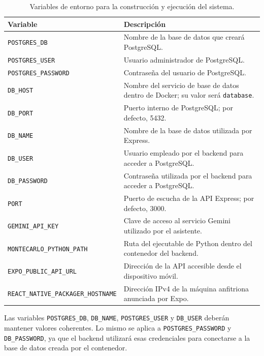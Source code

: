 \begin{table}[H]
\centering
\caption{Variables de entorno para la construcci\'on y ejecuci\'on del sistema.}
\label{tab:variables-entorno-construccion}
\begin{tabular}{|p{4.8cm}|p{8.2cm}|}
\hline
\textbf{Variable} & \textbf{Descripci\'on} \\
\hline
\texttt{POSTGRES\_DB} & Nombre de la base de datos que crear\'a PostgreSQL. \\
\hline
\texttt{POSTGRES\_USER} & Usuario administrador de PostgreSQL. \\
\hline
\texttt{POSTGRES\_PASSWORD} & Contrase\~na del usuario de PostgreSQL. \\
\hline
\texttt{DB\_HOST} & Nombre del servicio de base de datos dentro de Docker; su valor ser\'a \texttt{database}. \\
\hline
\texttt{DB\_PORT} & Puerto interno de PostgreSQL; por defecto, 5432. \\
\hline
\texttt{DB\_NAME} & Nombre de la base de datos utilizada por Express. \\
\hline
\texttt{DB\_USER} & Usuario empleado por el backend para acceder a PostgreSQL. \\
\hline
\texttt{DB\_PASSWORD} & Contrase\~na utilizada por el backend para acceder a PostgreSQL. \\
\hline
\texttt{PORT} & Puerto de escucha de la API Express; por defecto, 3000. \\
\hline
\texttt{GEMINI\_API\_KEY} & Clave de acceso al servicio Gemini utilizado por el asistente. \\
\hline
\texttt{MONTECARLO\_PYTHON\_PATH} & Ruta del ejecutable de Python dentro del contenedor del backend. \\
\hline
\texttt{EXPO\_PUBLIC\_API\_URL} & Direcci\'on de la API accesible desde el dispositivo m\'ovil. \\
\hline
\texttt{REACT\_NATIVE\_PACKAGER\_HOSTNAME} & Direcci\'on IPv4 de la m\'aquina anfitriona anunciada por Expo. \\
\hline
\end{tabular}
\end{table}

Las variables \texttt{POSTGRES\_DB}, \texttt{DB\_NAME},
\texttt{POSTGRES\_USER} y \texttt{DB\_USER} deber\'an mantener valores
coherentes. Lo mismo se aplica a \texttt{POSTGRES\_PASSWORD} y
\texttt{DB\_PASSWORD}, ya que el backend utilizar\'a esas credenciales para
conectarse a la base de datos creada por el contenedor.

